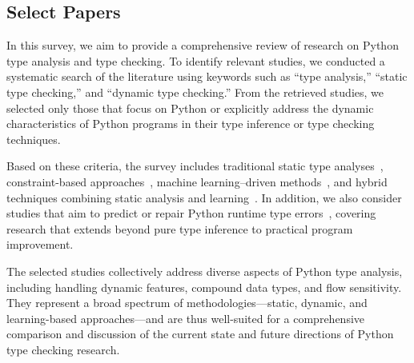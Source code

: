 \subsection{\textbf{Select Papers}}
In this survey, we aim to provide a comprehensive review of research on Python
type analysis and type checking. To identify relevant studies, we conducted a
systematic search of the literature using keywords such as “type analysis,”
“static type checking,” and “dynamic type checking.” From the retrieved
studies, we selected only those that focus on Python or explicitly address the
dynamic characteristics of Python programs in their type inference or type
checking techniques.

Based on these criteria, the survey includes traditional static type
analyses~\cite{static2014}, constraint-based approaches~\cite{MaxSMT2018},
machine learning–driven methods~\cite{pyinfer2021,lambdanet2020,typeT52023},
and hybrid techniques combining static analysis and
learning~\cite{hityper2022,static2023,dlinfer2023}. 
In addition, we also consider studies that aim to predict or repair Python
runtime type errors~\cite{pyter2022,pyty2024,pyinder2024,quac2024}, covering
research that extends beyond pure type inference to practical program
improvement.

The selected studies collectively address diverse aspects of Python type
analysis, including handling dynamic features, compound data types, and flow
sensitivity. They represent a broad spectrum of methodologies—static, dynamic,
and learning-based approaches—and are thus well-suited for a comprehensive
comparison and discussion of the current state and future directions of Python
type checking research.
